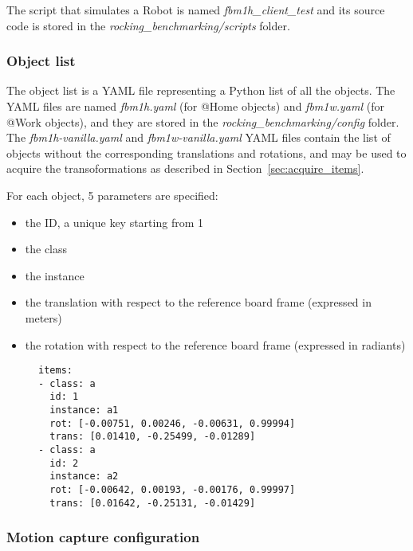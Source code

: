 \documentclass[a4paper]{article}
\begin{document}
The script that simulates a Robot is named \emph{fbm1h\_client\_test} and its source code is stored in the \emph{rocking\_benchmarking/scripts} folder.

\clearpage

\subsubsection{Object list}

The object list is a YAML file representing a Python list of all the objects.
The YAML files are named \emph{fbm1h.yaml} (for @Home objects) and \emph{fbm1w.yaml} (for @Work objects), and they are stored in the \emph{rocking\_benchmarking/config} folder.
The \emph{fbm1h-vanilla.yaml} and \emph{fbm1w-vanilla.yaml} YAML files contain the list of objects without the corresponding translations and rotations, and may be used to acquire the transoformations as described in Section~\ref{sec:acquire_items}.

For each object, 5 parameters are specified:

\begin{itemize}
  \item the ID, a unique key starting from 1
  \item the class
  \item the instance
  \item the translation with respect to the reference board frame (expressed in meters)
  \item the rotation with respect to the reference board frame (expressed in radiants)
\end{itemize}

\begin{figure}[h!]
	\noindent
	\begin{minipage}[t!]{\linewidth}
		\begin{lstlisting}[caption=fbm1h.yaml]
items:
- class: a
  id: 1
  instance: a1
  rot: [-0.00751, 0.00246, -0.00631, 0.99994]
  trans: [0.01410, -0.25499, -0.01289]
- class: a
  id: 2
  instance: a2
  rot: [-0.00642, 0.00193, -0.00176, 0.99997]
  trans: [0.01642, -0.25131, -0.01429]
    \end{lstlisting}
	\end{minipage}
\end{figure}

\subsubsection{Motion capture configuration}
\end{document}

